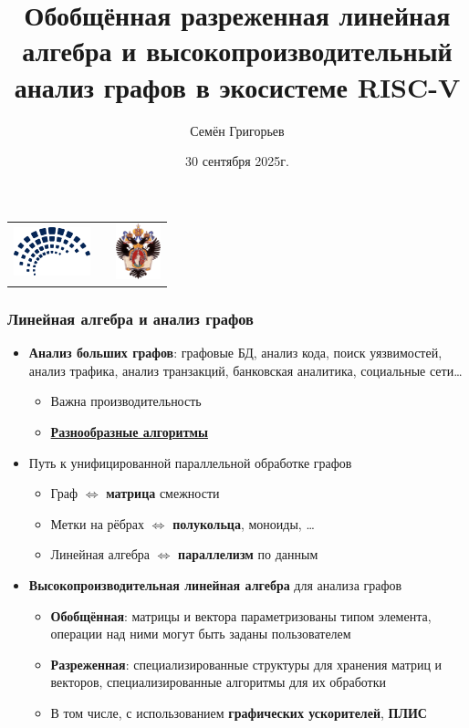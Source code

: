 \documentclass[xcolor=table,aspectratio=169]{beamer}
\title[Разреженная линейная алгебра и графы]{Обобщённая разреженная линейная алгебра и высокопроизводительный анализ графов в экосистеме RISC-V}
\institute[СПбГУ]{
Санкт-Петербургский Государственный Университет
}
\author[Семён Григорьев]{Семён Григорьев}
\date{30 сентября 2025г.}
\begin{document}
{
\begin{frame}[fragile]
  \begin{table}
  \centering
  \begin{tabularx}{\linewidth}{XcX}
    \includegraphics[height=1.4cm]{pictures/RuSCDays_logo_blue.pdf} \hfill
    & 
    & \hfill \includegraphics[height=1.6cm]{pictures/SPbGU_Logo.png}
  \end{tabularx}
  \end{table}
  \titlepage
\end{frame}
}

\begin{frame}[fragile]
  \frametitle{Линейная алгебра и анализ графов}
  \begin{itemize}
    \item \textbf{Анализ больших графов}: графовые БД, анализ кода, поиск уязвимостей, анализ трафика, анализ транзакций, банковская аналитика, социальные сети\ldots
      \begin{itemize}
        \item Важна производительность
        \item \underline{\textbf{Разнообразные алгоритмы}}
      \end{itemize}
    \item Путь к унифицированной параллельной обработке графов  
      \begin{itemize}
        \item Граф $\iff$ \textbf{матрица} смежности
        \item Метки на рёбрах $\iff$ \textbf{полукольца}, моноиды, \ldots
        \item Линейная алгебра $\iff$ \textbf{параллелизм} по данным
      \end{itemize}
    \item \textbf{Высокопроизводительная линейная алгебра} для анализа графов
      \begin{itemize}
        \item \textbf{Обобщённая}: матрицы и вектора параметризованы типом элемента, операции над ними могут быть заданы пользователем
        \item \textbf{Разреженная}: специализированные структуры для хранения матриц и векторов, специализированные алгоритмы для их обработки 
        \item В том числе, с использованием \textbf{графических ускорителей}, \textbf{ПЛИС}
      \end{itemize}
    \end{itemize}
\end{frame}
\end{document}
